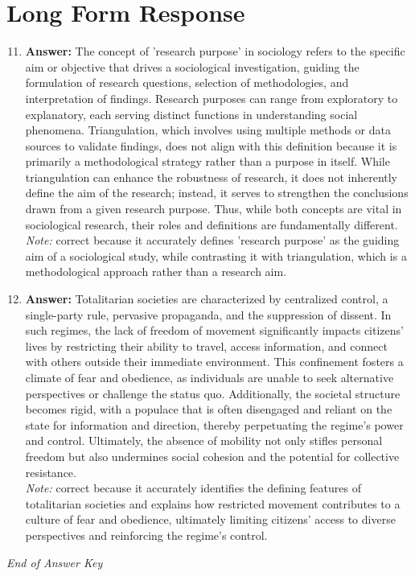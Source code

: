 \documentclass[12pt]{article}
\begin{document}
\section*{Long Form Response}
\begin{enumerate}[label=\arabic*.]
\setcounter{enumi}{10}
\item \textbf{Answer:} The concept of 'research purpose' in sociology refers to the specific aim or objective that drives a sociological investigation, guiding the formulation of research questions, selection of methodologies, and interpretation of findings. Research purposes can range from exploratory to explanatory, each serving distinct functions in understanding social phenomena. Triangulation, which involves using multiple methods or data sources to validate findings, does not align with this definition because it is primarily a methodological strategy rather than a purpose in itself. While triangulation can enhance the robustness of research, it does not inherently define the aim of the research; instead, it serves to strengthen the conclusions drawn from a given research purpose. Thus, while both concepts are vital in sociological research, their roles and definitions are fundamentally different.
\\ \textit{Note:} correct because it accurately defines 'research purpose' as the guiding aim of a sociological study, while contrasting it with triangulation, which is a methodological approach rather than a research aim.
\item \textbf{Answer:} Totalitarian societies are characterized by centralized control, a single-party rule, pervasive propaganda, and the suppression of dissent. In such regimes, the lack of freedom of movement significantly impacts citizens' lives by restricting their ability to travel, access information, and connect with others outside their immediate environment. This confinement fosters a climate of fear and obedience, as individuals are unable to seek alternative perspectives or challenge the status quo. Additionally, the societal structure becomes rigid, with a populace that is often disengaged and reliant on the state for information and direction, thereby perpetuating the regime's power and control. Ultimately, the absence of mobility not only stifles personal freedom but also undermines social cohesion and the potential for collective resistance.
\\ \textit{Note:} correct because it accurately identifies the defining features of totalitarian societies and explains how restricted movement contributes to a culture of fear and obedience, ultimately limiting citizens' access to diverse perspectives and reinforcing the regime's control.
\end{enumerate}

\vfill
\noindent\textit{End of Answer Key}
\end{document}
